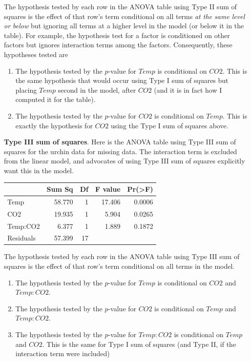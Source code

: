 \documentclass[]{book}
\begin{document}
The hypothesis tested by each row in the ANOVA table using Type II sum
of squares is the effect of that row's term conditional on all terms
\emph{at the same level or below} but ignoring all terms at a higher
level in the model (or below it in the table). For example, the
hypothesis test for a factor is conditioned on other factors but ignores
interaction terms among the factors. Consequently, these hypotheses
tested are

\begin{enumerate}
\def\labelenumi{\arabic{enumi}.}
\item
  The hypothesis tested by the \(p\)-value for \(Temp\) is conditional
  on \(CO2\). This is the same hypothesis that would occur using Type I
  sum of squares but placing \(Temp\) second in the model, after \(CO2\)
  (and it is in fact how I computed it for the table).
\item
  The hypothesis tested by the \(p\)-value for \(CO2\) is conditional on
  \(Temp\). This is exactly the hypothesis for \(CO2\) using the Type I
  sum of squares above.
\end{enumerate}

\textbf{Type III sum of squares}. Here is the ANOVA table using Type III
sum of squares for the urchin data for missing data. The interaction
term is excluded from the linear model, and advocates of using Type III
sum of squares explicitly want this in the model.

\begin{tabular}{l|r|r|r|r}
\hline
  & Sum Sq & Df & F value & Pr(>F)\\
\hline
Temp & 58.770 & 1 & 17.406 & 0.0006\\
\hline
CO2 & 19.935 & 1 & 5.904 & 0.0265\\
\hline
Temp:CO2 & 6.377 & 1 & 1.889 & 0.1872\\
\hline
Residuals & 57.399 & 17 &  & \\
\hline
\end{tabular}

The hypothesis tested by each row in the ANOVA table using Type III sum
of squares is the effect of that row's term conditional on all terms in
the model.

\begin{enumerate}
\def\labelenumi{\arabic{enumi}.}
\item
  The hypothesis tested by the \(p\)-value for \(Temp\) is conditional
  on \(CO2\) and \(Temp:CO2\).
\item
  The hypothesis tested by the \(p\)-value for \(CO2\) is conditional on
  \(Temp\) and \(Temp:CO2\).
\item
  The hypothesis tested by the \(p\)-value for \(Temp:CO2\) is
  conditional on \(Temp\) and \(CO2\). This is the same for Type I sum
  of squares (and Type II, if the interaction term were included)
\end{enumerate}
\end{document}
